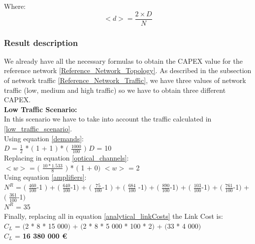 Where:
\begin{equation}
<d> = \frac{2 \times D}{N}
\label{average_demand}
\end{equation}


\subsubsection{Result description}

We already have all the necessary formulas to obtain the CAPEX value for the reference network \ref{Reference_Network_Topology}. As described in the subsection of network traffic \ref{Reference_Network_Traffic}, we have three values of network traffic (low, medium and high traffic) so we have to obtain three different CAPEX.\\

\textbf{Low Traffic Scenario:}\\
In this scenario we have to take into account the traffic calculated in \ref{low_traffic_scenario}.\\

Using equation \ref{demands}:\\

$D$ = $\frac{1}{2}$ * $($ 1 + 1 $)$ * $($ $\frac{1000}{100}$ $)$ \qquad \qquad $D$ = 10\\

Replacing in equation \ref{optical_channels}:\\

$<w>$ = $($ $\frac{10 * 1.533}{8}$ $)$ * $($ 1 + 0$)$ \qquad \qquad $<w>$ = 2\\

Using equation \ref{amplifiers}:\\

$N^R$ = $($ $\frac{460}{100}$-1 $)$ + $($ $\frac{640}{100}$-1$)$ + $($ $\frac{75}{100}$-1 $)$ + $($ $\frac{684}{100}$ -1$)$ + $($ $\frac{890}{100}$-1$)$ + $($ $\frac{103}{100}$-1$)$ + $($ $\frac{761}{100}$-1$)$ + $($ $\frac{361}{100}$-1$)$\\

$N^R$ = 35\\

Finally, replacing all in equation \ref{analytical_linkCosts} the Link Cost is:\\

$C_L$ = $($2 * 8 * 15 000$)$ + $($2 * 8 * 5 000 * 100 * 2$)$ + $($33 * 4 000$)$\\

$C_L$ = \textbf{16 380 000 \euro}\\

